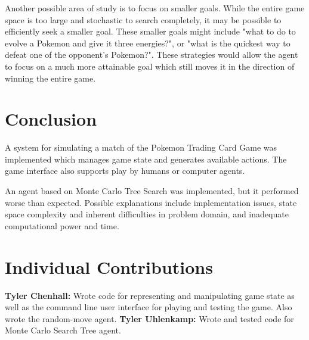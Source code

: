 \documentclass{article}
\begin{document}
Another possible area of study is to focus on smaller goals.  While the entire game space is too large and stochastic to search completely, it may be possible to efficiently seek a smaller goal.  These smaller goals might include "what to do to evolve a Pokemon and give it three energies?", or "what is the quickest way to defeat one of the opponent's Pokemon?".  These strategies would allow the agent to focus on a much more attainable goal which still moves it in the direction of winning the entire game.

\section{Conclusion} %
A system for simulating a match of the Pokemon Trading Card Game was implemented which manages game state and generates available actions. The game interface also supports play by humans or computer agents.

An agent based on Monte Carlo Tree Search was implemented, but it performed worse than expected. Possible explanations include implementation issues, state space complexity and inherent difficulties in problem domain, and inadequate computational power and time. 

\section{Individual Contributions}%
\textbf{Tyler Chenhall: } Wrote code for representing and manipulating game state as well as the command line user interface for  playing and testing the game. Also wrote the random-move agent. 
\textbf{Tyler Uhlenkamp: } Wrote and tested code for Monte Carlo Search Tree agent. 





\end{document}
